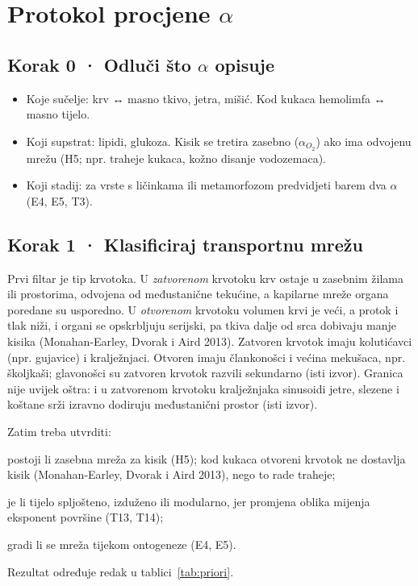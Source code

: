 \section{Protokol procjene $\alpha$}\label{sec:protokol}

\subsection*{Korak 0 · Odluči što $\alpha$ opisuje}
\begin{itemize}
\item Koje sučelje: krv ↔ masno tkivo, jetra, mišić. Kod kukaca hemolimfa ↔ masno tijelo.
\item Koji supstrat: lipidi, glukoza. Kisik se tretira zasebno ($\alpha_{O_2}$) ako ima odvojenu mrežu (H5; npr. traheje kukaca, kožno disanje vodozemaca).
\item Koji stadij: za vrste s ličinkama ili metamorfozom predvidjeti barem dva $\alpha$ (E4, E5, T3).
\end{itemize}

\subsection*{Korak 1 · Klasificiraj transportnu mrežu}
Prvi filtar je tip krvotoka. U \emph{zatvorenom} krvotoku krv ostaje u zasebnim žilama ili prostorima, odvojena od međustanične tekućine, a kapilarne mreže organa poredane su usporedno. U \emph{otvorenom} krvotoku volumen krvi je veći, a protok i tlak niži, i organi se opskrbljuju serijski, pa tkiva dalje od srca dobivaju manje kisika (Monahan-Earley, Dvorak i Aird 2013). Zatvoren krvotok imaju kolutićavci (npr. gujavice) i kralježnjaci. Otvoren imaju člankonošci i većina mekušaca, npr. školjkaši; glavonošci su zatvoren krvotok razvili sekundarno (isti izvor). Granica nije uvijek oštra: i u zatvorenom krvotoku kralježnjaka sinusoidi jetre, slezene i koštane srži izravno dodiruju međustanični prostor (isti izvor).

Zatim treba utvrditi:
\begin{enumerate*}[label=(\roman*)]
\item postoji li zasebna mreža za kisik (H5); kod kukaca otvoreni krvotok ne dostavlja kisik (Monahan-Earley, Dvorak i Aird 2013), nego to rade traheje;
\item je li tijelo spljošteno, izduženo ili modularno, jer promjena oblika mijenja eksponent površine (T13, T14);
\item gradi li se mreža tijekom ontogeneze (E4, E5).
\end{enumerate*}
Rezultat određuje redak u tablici~\ref{tab:priori}.

